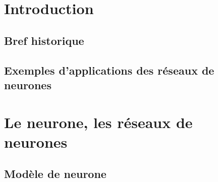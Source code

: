 \section{Introduction}

\subsection{Bref historique}

\subsection{Exemples d'applications des réseaux de neurones}

\section{Le neurone, les réseaux de neurones}

\subsection{Modèle de neurone}

